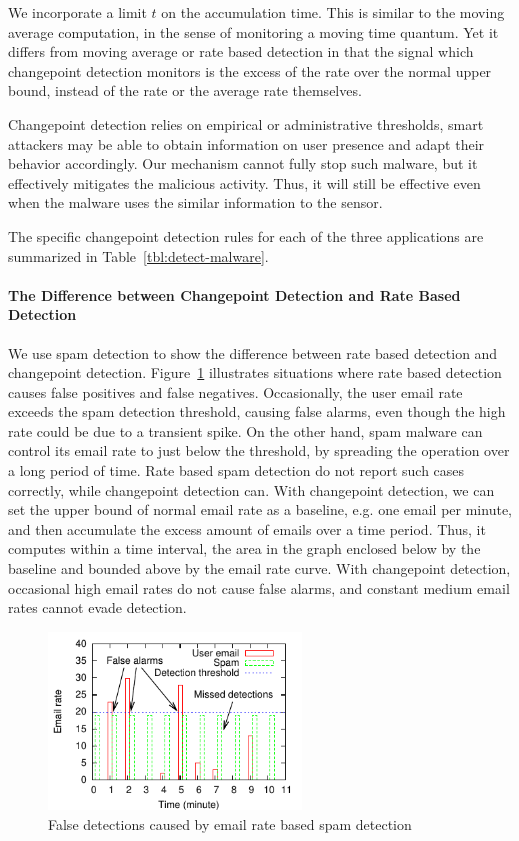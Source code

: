 We incorporate a limit $t$ on the accumulation time.  This is similar to the
moving average computation, in the sense of monitoring a moving time quantum.
Yet it differs from moving average or rate based detection in that the signal
which changepoint detection monitors is the excess of the rate over the normal
upper bound, instead of the rate or the average rate themselves.

Changepoint detection relies on empirical or administrative
thresholds, smart attackers may be able to obtain information on user presence
and adapt their behavior accordingly. Our mechanism cannot fully
stop such malware, but it effectively mitigates the malicious activity.
Thus, it will still be effective even when the malware uses the 
similar information to the sensor.

The specific changepoint detection rules for each of the three applications
are summarized in Table~\ref{tbl:detect-malware}. 

\paragraph{The Difference between Changepoint Detection and 
Rate Based Detection}

We use spam detection to show the difference between rate based
detection and changepoint detection. Figure~\ref{fig:detect-by-rate}
illustrates situations where rate based detection causes false
positives and false negatives. Occasionally, the user email rate
exceeds the spam detection threshold, causing false alarms, even
though the high rate could be due to a transient spike. 
On the other hand, spam malware
can control its email rate to just below the threshold, by spreading
the operation over a long period of time. Rate based spam detection
do not report such cases correctly, while changepoint detection can.
With changepoint detection, we can set the upper bound of normal
email rate as a baseline, e.g. one email per minute, and then accumulate
the excess amount of emails over a time period. Thus, it computes
within a time interval, the area in the graph enclosed below by the
baseline and bounded above by the email rate curve. With changepoint
detection, occasional high email rates do not cause false alarms,
and constant medium email rates cannot evade detection. 

\begin{figure}[htb]
\begin{center}
\includegraphics[width=0.6\textwidth]{sensor/email}
\caption{False detections caused by email rate based spam detection}
\label{fig:detect-by-rate}
\end{center}
\end{figure}
